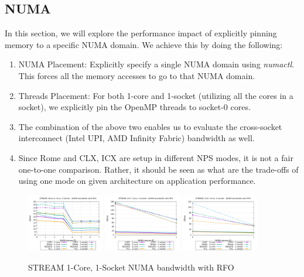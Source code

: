 \documentclass{article}
\begin{document}
\subsection{NUMA}
In this section, we will explore the performance impact of explicitly pinning memory to a specific NUMA domain. We achieve this by doing the following: 
\begin{enumerate}
\item NUMA Placement: Explicitly specify a single NUMA domain using \textit{numactl}. This forces all the memory accesses to go to that NUMA domain.
\item Threads Placement: For both 1-core and 1-socket (utilizing all the cores in a socket), we explicitly pin the OpenMP threads to socket-0 cores. 
\item The combination of the above two enables us to evaluate the cross-socket interconnect (Intel UPI, AMD Infinity Fabric) bandwidth as well.
\item Since Rome and CLX, ICX are setup in different NPS modes, it is not a fair one-to-one comparison. Rather, it should be seen as what are the trade-offs of using one mode on given architecture on application performance.
\end{enumerate}
 
\begin{figure}[!ht]
    \centering
    \includegraphics[width=0.3\textwidth]{../mem_bw_numa/Rome_numa_nps4_compact_rfo}
    \includegraphics[width=0.3\textwidth]{../mem_bw_numa/ICX_numa_nps1_compact_rfo}
    \includegraphics[width=0.3\textwidth]{../mem_bw_numa/CLX_numa_nps1_compact_rfo}
    \caption{STREAM 1-Core, 1-Socket NUMA bandwidth with RFO}
    \label{figure:mem_bw_numa_rfo}
\end{figure}
\end{document}
